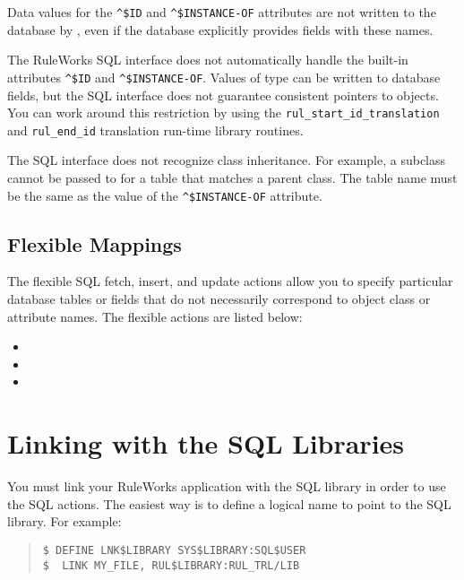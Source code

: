 \begin{note}
  Data values for the \verb|^$ID| and \verb|^$INSTANCE-OF| attributes
  are not written to the database by , even if
  the database explicitly provides fields with these names.
\end{note}

The RuleWorks SQL interface does not automatically handle the built-in
attributes \verb|^$ID| and \verb|^$INSTANCE-OF|. Values of type
 can be written to database fields, but the SQL
interface does not guarantee consistent pointers to objects. You can
work around this restriction by using the
\verb|rul_start_id_translation| and \verb|rul_end_id| translation
run-time library routines.

The SQL interface does not recognize class inheritance. For example, a
subclass cannot be passed to  for a table
that matches a parent class. The table name must be the same as the
value of the \verb|^$INSTANCE-OF| attribute.

\subsection{Flexible Mappings}

The flexible SQL fetch, insert, and update actions allow you to
specify particular database tables or fields that do not necessarily
correspond to object class or attribute names. The flexible actions
are listed below:

\begin{itemize}
\item {}
\item {}
\item {}
\end{itemize}

\section{Linking with the SQL Libraries}

You must link your RuleWorks application with the SQL library in order
to use the SQL actions. The easiest way is to define a logical name to
point to the SQL library. For example:

\begin{quote}
\begin{verbatim}
$ DEFINE LNK$LIBRARY SYS$LIBRARY:SQL$USER
$  LINK MY_FILE, RUL$LIBRARY:RUL_TRL/LIB
\end{verbatim}
\end{quote}

